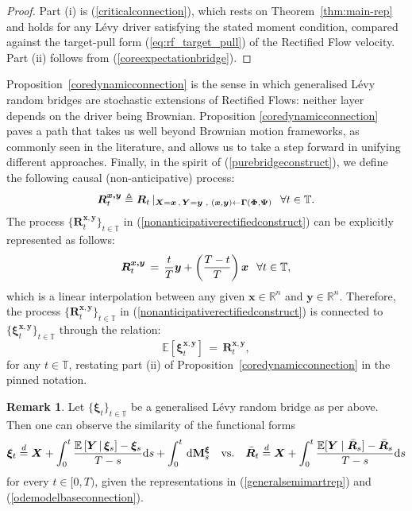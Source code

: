 \documentclass{article}
\newcommand{\levy}{{L\'evy }}
\def\R{\mathbb{R}}
\def\E{\mathbb{E}}
\def\T{\mathbb{T}}
\def\d{\,\mathrm{d}}
\def\dd{\mathrm{d}}
\def\xib{\boldsymbol{\xi}}
\theoremstyle{definition}
\newtheorem{remark}[proposition]{Remark}
\begin{document}
\begin{proof}
Part (i) is (\ref{criticalconnection}), which rests on Theorem~\ref{thm:main-rep} and holds for any \levy driver satisfying the stated moment condition, compared against the target-pull form (\ref{eq:rf_target_pull}) of the Rectified Flow velocity. Part (ii) follows from (\ref{coreexpectationbridge}).
\end{proof}
Proposition~\ref{coredynamicconnection} is the sense in which generalised \levy random bridges are stochastic extensions of Rectified Flows: neither layer depends on the driver being Brownian.
Proposition \ref{coredynamicconnection} paves a path that takes us well beyond Brownian motion frameworks, as commonly seen in the literature, and allows us to take a step forward in unifying different approaches. Finally, in the spirit of (\ref{purebridgeconstruct}), we define the following causal (non-anticipative) process:
\begin{align}
\boldsymbol{R}^{\boldsymbol{x,y}}_t \triangleq  \boldsymbol{R}_t \, |_{\boldsymbol{X} = \boldsymbol{x} \, , \, \boldsymbol{Y} = \boldsymbol{y} \,\, , \,\, (\boldsymbol{x},\boldsymbol{y}) \leftarrow \boldsymbol{\Gamma}(\boldsymbol{\Phi},\boldsymbol{\Psi})} \hspace{0.1in} \forall t\in\T. \label{nonanticipativerectifiedconstruct}
\end{align}
The process $\{\boldsymbol{R}^{\boldsymbol{x,y}}_t\}_{t\in\mathbb{T}}$ in (\ref{nonanticipativerectifiedconstruct}) can be explicitly represented as follows:
\begin{align}
\boldsymbol{R}^{\boldsymbol{x,y}}_t  \, = \, \frac{t}{T}\boldsymbol{y} + \left(\frac{T-t}{T}\right)\boldsymbol{x} \hspace{0.1in} \forall t\in\T, \notag
\end{align}
which is a linear interpolation between any given $\boldsymbol{x}\in\R^n$ and $\boldsymbol{y}\in\R^n$. Therefore, the process $\{\boldsymbol{R}^{\boldsymbol{x,y}}_t\}_{t\in\mathbb{T}}$ in (\ref{nonanticipativerectifiedconstruct}) is connected to $\{\xib^{\boldsymbol{x,y}}_t\}_{t\in\mathbb{T}}$ through the relation:
\begin{equation}
        \E\left[\boldsymbol{\xi}^{\boldsymbol{x},\boldsymbol{y}}_t\right] \, = \, \boldsymbol{R}^{\boldsymbol{x,y}}_t, \label{rectifiedrandomexpectationequality}
    \end{equation}
for any $t\in\T$, restating part (ii) of Proposition~\ref{coredynamicconnection} in the pinned notation.
\begin{remark}
Let $\{\xib_t\}_{t\in\T}$ be a generalised \levy random bridge as per above. Then one can observe the similarity of the functional forms
\begin{align}
\xib_t \overset{d}{=}  \boldsymbol{X} + \int_0^t \frac{\E\left[ \boldsymbol{Y} \, | \, \xib_s \right] - \xib_s }{T-s}\dd s + \int_0^t \d \mathbf{M}^{\xib}_s \,\,\,\,\,\, \text{vs.} \,\,\,\,\,\, \bar{\boldsymbol{R}}_t \overset{d}{=} \boldsymbol{X} + \int_0^t \frac{\mathbb{E}[\boldsymbol{Y} \mid \bar{\boldsymbol{R}}_s] - \bar{\boldsymbol{R}}_s}{T-s}\mathrm{d}s \notag
\end{align}
for every $t\in[0,T)$, given the representations in (\ref{generalsemimartrep}) and (\ref{odemodelbaseconnection}).
\end{remark}
\end{document}
